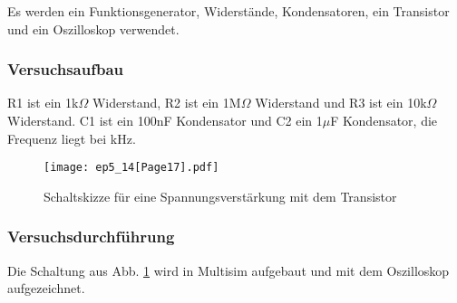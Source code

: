 \documentclass[12pt,a4paper]{article}
\begin{document}
Es werden ein Funktionsgenerator, Widerstände, Kondensatoren, ein Transistor und ein Oszilloskop verwendet.

\subsubsection{Versuchsaufbau}

R1 ist ein 1k$\Omega$ Widerstand, R2 ist ein 1M$\Omega$ Widerstand und R3 ist ein 10k$\Omega$ Widerstand. C1 ist ein 100nF Kondensator und C2 ein 1$\mu$F Kondensator, die Frequenz liegt bei \unit[30] {kHz}.


\begin{figure}[H] 
  \centering
    \texttt{[image: ep5\_14[Page17].pdf]}
  	\caption[Schaltskizze für eine Spannungsverstärkung mit dem Transistor]{Schaltskizze für eine Spannungsverstärkung mit dem Transistor\footnotemark}
  \label{fig:3.4}
\end{figure}

\subsubsection{Versuchsdurchführung}
Die Schaltung aus Abb. \ref{fig:3.4} wird in Multisim aufgebaut und mit dem Oszilloskop aufgezeichnet.
\end{document}
